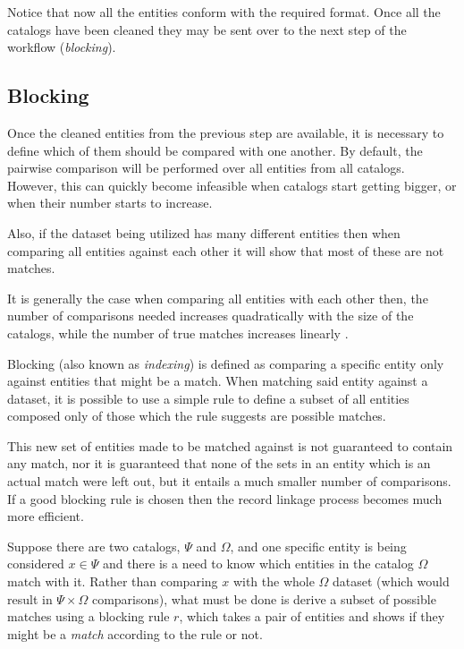 \documentclass[epsfig,a4paper,11pt,titlepage,twoside,openany]{book}
\begin{document}
Notice that now all the entities conform with the required format. Once all the
catalogs have been cleaned they may be sent over to the next step of the workflow
(\textit{blocking}).



\subsection{Blocking}
\label{sec:rl-workflow-blocking}


Once the cleaned entities from the previous step are available, it is necessary to define which
of them should be compared with one another. By default, the pairwise comparison will be performed over all entities from all catalogs. However, this can quickly
become infeasible when catalogs start getting bigger, or when their number starts to increase. 

Also, if the dataset being utilized has many different
entities then when comparing all entities against each other it will show that most of these are not matches.


It is generally the case when comparing all entities with each other then,
the number of comparisons needed increases quadratically with the size of the
catalogs, while the number of true matches increases linearly
\cite{christen12_data}.

Blocking (also known as \textit{indexing}) is defined as comparing a specific entity only against entities that might be a match. When matching said entity against a dataset, it is possible to use a simple rule to define a subset of all entities
composed only of those which the rule suggests are possible matches. 

This new set of entities made to be matched against is not guaranteed to contain any match, nor it
is guaranteed that none of the sets in an entity which is an actual match were left out, but it entails a much smaller number of comparisons. 
If a good blocking rule is chosen then the record linkage process becomes much more efficient.

Suppose there are two catalogs, $\Psi$ and $\Omega$, and one specific entity is being considered $x \in
\Psi$ and there is a need to know which entities in the catalog $\Omega$ match with it.
Rather than comparing $x$ with the whole $\Omega$ dataset (which would result in
$\Psi \times \Omega$ comparisons), what must be done is derive a subset of possible matches using a
blocking rule $r$, which takes a pair of entities and shows if they might be a \textit{match} according to the rule or not.
\end{document}
